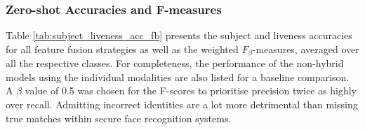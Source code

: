\documentclass{mpaper}
\begin{document}
\subsubsection{Zero-shot Accuracies and F-measures}
Table \ref{tab:subject_liveness_acc_fb} presents the subject and liveness accuracies for all feature fusion strategies as well as the weighted $F_{\beta}$-measures, averaged over all the respective classes. For completeness, the performance of the non-hybrid models using the individual modalities are also listed for a baseline comparison. A $\beta$ value of 0.5 was chosen for the F-scores to prioritise precision twice as highly over recall. Admitting incorrect identities are a lot more detrimental than missing true matches within secure face recognition systems.

\begin{table}[htbp]
    \centering
    \vspace{0.1cm}
    \caption{Subject and liveness accuracies and weighted-averaged $F_{0.5}$ measures for the seven feature fusion strategies along with the individual modalities.}
    \label{tab:subject_liveness_acc_fb}
    \vspace{-0.1cm}
\end{table}
\end{document}
